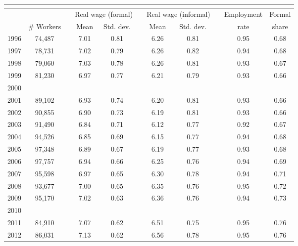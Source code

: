 \begin{tabular}{lcccccccccc}
  \multicolumn{11}{l}{{\small{}
  }}\tabularnewline
  \hline
  \hline
   &  &  & \multicolumn{2}{c}{{\small{}Real wage (formal)}} &  & \multicolumn{2}{c}{{\small{}Real wage (informal)}} &  & {\small{}Employment} & {\small{}Formal}\tabularnewline
  \cline{4-5} \cline{5-5} \cline{7-8} \cline{8-8}
   & {\small{}\# Workers } &  & {\small{}Mean } & {\small{}Std. dev. } &  & {\small{}Mean } & {\small{}Std. dev. } &  & {\small{}rate} & {\small{}share}\tabularnewline
  \hline
  {\small{}1996 } & {\small{}74,487} &  & {\small{}7.01} & {\small{}0.81} &  & {\small{}6.26} & {\small{}0.81} &  & {\small{}0.95} & {\small{}0.68}\tabularnewline
  {\small{}1997 } & {\small{}78,731} &  & {\small{}7.02} & {\small{}0.79} &  & {\small{}6.26} & {\small{}0.82} &  & {\small{}0.94} & {\small{}0.68}\tabularnewline
  {\small{}1998 } & {\small{}79,060} &  & {\small{}7.03} & {\small{}0.78} &  & {\small{}6.26} & {\small{}0.81} &  & {\small{}0.93} & {\small{}0.67}\tabularnewline
  {\small{}1999 } & {\small{}81,230} &  & {\small{}6.97} & {\small{}0.77} &  & {\small{}6.21} & {\small{}0.79} &  & {\small{}0.93} & {\small{}0.66}\tabularnewline
  {\small{}2000 } & {\small} &  & {\small} & {\small} &  & {\small} & {\small} &  & {\small} & {\small}\tabularnewline
  {\small{}2001 } & {\small{}89,102} &  & {\small{}6.93} & {\small{}0.74} &  & {\small{}6.20} & {\small{}0.81} &  & {\small{}0.93} & {\small{}0.66}\tabularnewline
  {\small{}2002 } & {\small{}90,855} &  & {\small{}6.90} & {\small{}0.73} &  & {\small{}6.19} & {\small{}0.81} &  & {\small{}0.93} & {\small{}0.66}\tabularnewline
  {\small{}2003 } & {\small{}91,490} &  & {\small{}6.84} & {\small{}0.71} &  & {\small{}6.12} & {\small{}0.77} &  & {\small{}0.92} & {\small{}0.67}\tabularnewline
  {\small{}2004 } & {\small{}94,526} &  & {\small{}6.85} & {\small{}0.69} &  & {\small{}6.15} & {\small{}0.77} &  & {\small{}0.94} & {\small{}0.68}\tabularnewline
  {\small{}2005 } & {\small{}97,348} &  & {\small{}6.89} & {\small{}0.67} &  & {\small{}6.19} & {\small{}0.77} &  & {\small{}0.93} & {\small{}0.68}\tabularnewline
  {\small{}2006 } & {\small{}97,757} &  & {\small{}6.94} & {\small{}0.66} &  & {\small{}6.25} & {\small{}0.76} &  & {\small{}0.94} & {\small{}0.69}\tabularnewline
  {\small{}2007 } & {\small{}95,598} &  & {\small{}6.97} & {\small{}0.65} &  & {\small{}6.30} & {\small{}0.78} &  & {\small{}0.94} & {\small{}0.71}\tabularnewline
  {\small{}2008 } & {\small{}93,677} &  & {\small{}7.00} & {\small{}0.65} &  & {\small{}6.35} & {\small{}0.76} &  & {\small{}0.95} & {\small{}0.72}\tabularnewline
  {\small{}2009 } & {\small{}95,170} &  & {\small{}7.02} & {\small{}0.63} &  & {\small{}6.36} & {\small{}0.76} &  & {\small{}0.94} & {\small{}0.73}\tabularnewline
  {\small{}2010 } & {\small} &  & {\small} & {\small} &  & {\small} & {\small} &  & {\small} & {\small}\tabularnewline
  {\small{}2011 } & {\small{}84,910} &  & {\small{}7.07} & {\small{}0.62} &  & {\small{}6.51} & {\small{}0.75} &  & {\small{}0.95} & {\small{}0.76}\tabularnewline
  {\small{}2012 } & {\small{}86,031} &  & {\small{}7.13} & {\small{}0.62} &  & {\small{}6.56} & {\small{}0.78} &  & {\small{}0.95} & {\small{}0.76}\tabularnewline
  \hline
\end{tabular}
